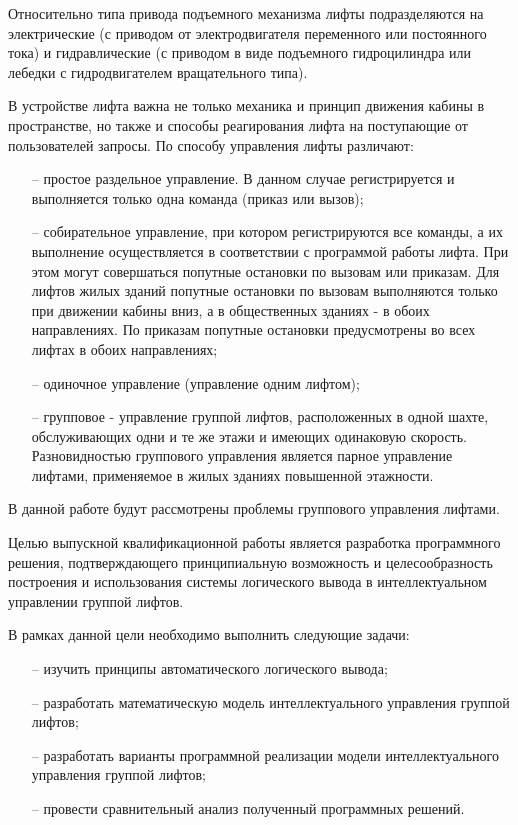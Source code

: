 	Относительно типа привода подъемного механизма лифты подразделяются на электрические
		(с приводом от электродвигателя пе­ременного или постоянного тока)
		и гидравлические (с приводом в виде подъемного гидроцилиндра или лебедки с гидродвигателем вращательного типа).

	В устройстве лифта важна не только механика и принцип движения кабины в пространстве,
		но также и способы реагирования лифта на поступающие от пользователей запросы.
		По способу управления лифты различают:
		\begin{itemize}
			\item[--] простое раздельное управление. В данном случае регистрируется
				и выполняется только одна команда (приказ или вызов);
			\item[--] собирательное управление, при котором регистрируются все команды,
				а их выполнение осуществляется в соответствии с программой работы лифта.
				При этом могут совершаться попутные остановки по вызовам или приказам.
				Для лифтов жилых зданий попутные остановки по вызовам выполняются только
				при движении кабины вниз, а в общественных зданиях - в обоих направлениях.
				По приказам попутные остановки предусмотрены во всех лифтах в обоих направлениях;
			\item[--] одиночное управление (управление одним лифтом);
			\item[--] групповое - управление группой лифтов, расположенных в одной шахте,
				обслуживающих одни и те же этажи и имеющих одинаковую скорость.
				Разновидностью группового управления является парное управление лифтами,
				применяемое в жилых зданиях повышенной этажности.
		\end{itemize}

	В данной работе будут рассмотрены проблемы группового управления лифтами.

	Целью выпускной квалификационной работы является разработка программного решения,
		подтверждающего принципиальную возможность и целесообразность построения
		и использования системы логического вывода в интеллектуальном управлении группой лифтов.

	В рамках данной цели необходимо выполнить следующие задачи:
		\begin{itemize}
			\item[--] изучить принципы автоматического логического вывода;
			\item[--] разработать математическую модель интеллектуального управления группой лифтов;
			\item[--] разработать варианты программной реализации модели интеллектуального управления группой лифтов;
			\item[--] провести сравнительный анализ полученный программных решений.
		\end{itemize}
